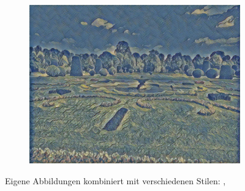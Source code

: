 \begin{figure}[H]
\begin{subfigure}[h]{0.32\textwidth}
        \includegraphics[width=\textwidth]{resources/content/experiments/garden-vgg16_the_olive_trees.jpg}
    \end{subfigure}

    \caption{Eigene Abbildungen kombiniert mit verschiedenen Stilen: \cite{teal_and_black_abstract_painting_img}, \cite{the_olive_trees_img}}
    \label{img:trained_models3}
\end{figure}